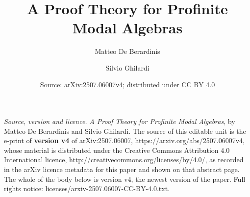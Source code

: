\documentclass[10pt,a4paper]{amsart}
\theoremstyle{definition}
\begin{document}
\title{A Proof Theory for Profinite Modal Algebras}
\author{Matteo De Berardinis}
\address{University of Amsterdam}
\author{Silvio Ghilardi}
\address{Universit\`a degli Studi di Milano}
\date{Source: arXiv:2507.06007v4; distributed under CC BY 4.0}
\maketitle
\noindent\emph{Source, version and licence.} \emph{A Proof Theory for Profinite Modal Algebras}, by Matteo De Berardinis and Silvio Ghilardi. The source of this editable unit is the e-print of \textbf{version v4} of arXiv:2507.06007, https://arxiv.org/abs/2507.06007v4, whose material is distributed under the Creative Commons Attribution 4.0 International licence, http://creativecommons.org/licenses/by/4.0/, as recorded in the arXiv licence metadata for this paper and shown on that abstract page. The whole of the body below is version v4, the newest version of the paper. Full rights notice: licenses/arxiv-2507.06007-CC-BY-4.0.txt.\par\smallskip
\end{document}
